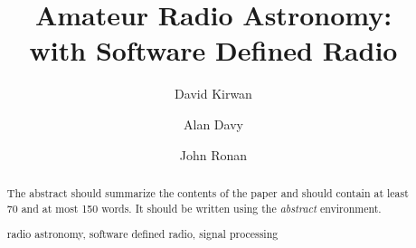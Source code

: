 \documentclass[runningheads,a4paper]{llncs}
\newcommand{\keywords}[1]{\par\addvspace\baselineskip
\noindent\keywordname\enspace\ignorespaces#1}
\begin{document}
\mainmatter  %

\title{Amateur Radio Astronomy:\\
with Software Defined Radio}


%
%
\author{David Kirwan%
\and Alan Davy\and John Ronan}
%


%
%

\maketitle


\begin{abstract}
The abstract should summarize the contents of the paper and should
contain at least 70 and at most 150 words. It should be written using the
\emph{abstract} environment.
\keywords{radio astronomy, software defined radio, signal processing}
\end{abstract}
\end{document}
